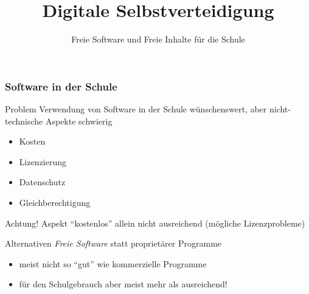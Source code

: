 \documentclass{beamer}
\begin{document}
\title{Digitale Selbstverteidigung}
\subtitle{Freie Software und Freie Inhalte für die Schule}

\maketitle

\begin{frame}
  \frametitle{Software in der Schule}

  \onslide<+->

  \begin{block}{Problem}
    Verwendung von Software in der Schule wünschenswert, aber
    nicht-technische Aspekte schwierig
    \begin{itemize}
    \item Kosten
    \item Lizenzierung
    \item Datenschutz
    \item Gleichberechtigung
    \end{itemize}
  \end{block}

  \onslide<+->

  \begin{block}{Achtung!}
    Aspekt \enquote{kostenlos} allein nicht ausreichend (mögliche
    Lizenzprobleme)
  \end{block}

  \onslide<+->

  \begin{block}{Alternativen}
    \emph{Freie Software} statt proprietärer Programme
    \begin{itemize}
    \item meist nicht so \enquote{gut} wie kommerzielle Programme
    \item für den Schulgebrauch aber meist mehr als ausreichend!
    \end{itemize}
  \end{block}

\end{frame}
\end{document}
